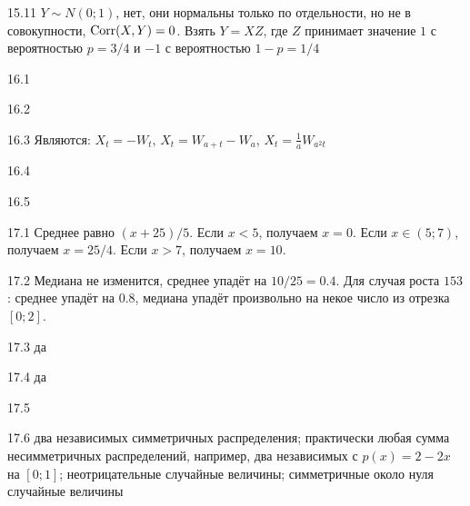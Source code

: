 \protect \hypertarget {soln:15.11}{}
\begin{solution}{{15.11}}
  $Y \sim N(0;1)$, нет, они нормальны только по отдельности, но не в совокупности, $\operatorname{Corr}(X,Y)=0$. Взять $Y=XZ$, где $Z$ принимает значение $1$ с вероятностью $p=3/4$ и $-1$ с вероятностью $1-p=1/4$
\end{solution}
\protect \hypertarget {soln:16.1}{}
\begin{solution}{{16.1}}
\end{solution}
\protect \hypertarget {soln:16.2}{}
\begin{solution}{{16.2}}
\end{solution}
\protect \hypertarget {soln:16.3}{}
\begin{solution}{{16.3}}
Являются: $X_{t}=-W_{t}$, $X_{t}=W_{a+t}-W_{a}$, $X_{t}=\frac{1}{a}W_{a^{2}t}$
\end{solution}
\protect \hypertarget {soln:16.4}{}
\begin{solution}{{16.4}}
\end{solution}
\protect \hypertarget {soln:16.5}{}
\begin{solution}{{16.5}}
\end{solution}
\protect \hypertarget {soln:17.1}{}
\begin{solution}{{17.1}}
Среднее равно $(x+25)/5$. Если $x<5$, получаем $x=0$. Если $x \in (5; 7)$, получаем $x=25/4$. Если $x>7$, получаем $x=10$.
\end{solution}
\protect \hypertarget {soln:17.2}{}
\begin{solution}{{17.2}}
Медиана не изменится, среднее упадёт на $10/25=0.4$. Для случая роста $153$: среднее упадёт на $0.8$, медиана упадёт произвольно на некое число из отрезка $[0;2]$.
\end{solution}
\protect \hypertarget {soln:17.3}{}
\begin{solution}{{17.3}}
  да
\end{solution}
\protect \hypertarget {soln:17.4}{}
\begin{solution}{{17.4}}
да
\end{solution}
\protect \hypertarget {soln:17.5}{}
\begin{solution}{{17.5}}
\end{solution}
\protect \hypertarget {soln:17.6}{}
\begin{solution}{{17.6}}
  два независимых симметричных распределения; практически любая сумма несимметричных распределений, например, два независимых с $p(x)=2-2x$ на $[0;1]$; неотрицательные случайные величины; симметричные около нуля случайные величины
\end{solution}

